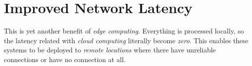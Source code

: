 \documentclass[../../main]{subfiles}
\begin{document}
\section{Improved Network Latency} \label{sec:}

This is yet another benefit of \emph{edge computing}. Everything is
processed locally, so the latency related with \emph{cloud computing}
literally become \emph{zero}. This enables these systems to be deployed
to \emph{remote locations} where there have unreliable connections or have
no connection at all.
\end{document}
